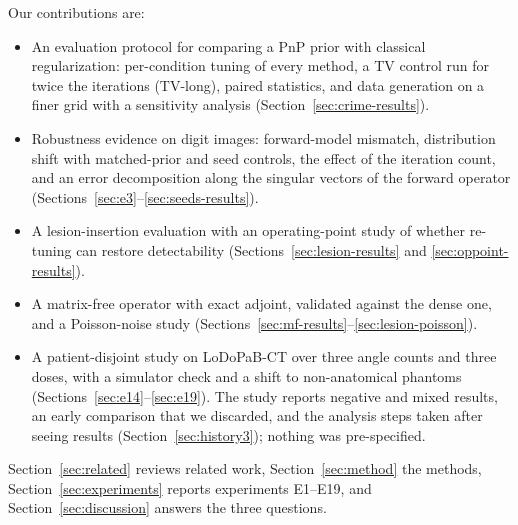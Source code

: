 Our contributions are:
\begin{itemize}
\item An evaluation protocol for comparing a PnP prior with classical regularization: per-condition tuning of
every method, a TV control run for twice the iterations (TV-long), paired statistics, and data generation on a
finer grid with a sensitivity analysis (Section~\ref{sec:crime-results}).
\item Robustness evidence on digit images: forward-model mismatch, distribution shift with matched-prior and seed
controls, the effect of the iteration count, and an error decomposition along the singular vectors of the forward
operator (Sections~\ref{sec:e3}--\ref{sec:seeds-results}).
\item A lesion-insertion evaluation with an operating-point study of whether re-tuning can restore detectability
(Sections~\ref{sec:lesion-results} and \ref{sec:oppoint-results}).
\item A matrix-free operator with exact adjoint, validated against the dense one, and a Poisson-noise study
(Sections~\ref{sec:mf-results}--\ref{sec:lesion-poisson}).
\item A patient-disjoint study on LoDoPaB-CT over three angle counts and three doses, with a simulator check and a
shift to non-anatomical phantoms (Sections~\ref{sec:e14}--\ref{sec:e19}). The study reports negative and mixed
results, an early comparison that we discarded, and the analysis steps taken after seeing results
(Section~\ref{sec:history3}); nothing was pre-specified.
\end{itemize}

Section~\ref{sec:related} reviews related work, Section~\ref{sec:method} the methods, Section~\ref{sec:experiments}
reports experiments E1--E19, and Section~\ref{sec:discussion} answers the three questions.